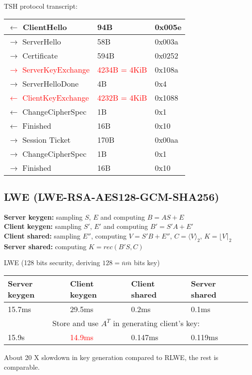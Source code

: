 \documentclass[12pt]{article}
\newcommand{\nbar}{\overline{n}}
\newcommand{\mbar}{\overline{m}}
\begin{document}
TSH protocol transcript:
\begin{center}
    \begin{tabular}{| l | l | l |}
    \hline
    $\leftarrow$ ClientHello & 94B & 0x005e\\ \hline
    $\rightarrow$ ServerHello & 58B & 0x003a\\ \hline
    $\rightarrow$ Certificate & 594B & 0x0252\\ \hline
    \textcolor{red}{$\rightarrow$ ServerKeyExchange} & \textcolor{red}{4234B = 4KiB} & 0x108a\\ \hline
    $\rightarrow$ ServerHelloDone & 4B & 0x4\\ \hline
    \textcolor{red}{$\leftarrow$ ClientKeyExchange} & \textcolor{red}{4232B = 4KiB} & 0x1088\\ \hline
    $\leftarrow$ ChangeCipherSpec & 1B & 0x1\\ \hline
    $\leftarrow$ Finished & 16B & 0x10\\ \hline
    $\rightarrow$ Session Ticket & 170B & 0x00aa\\ \hline
    $\rightarrow$ ChangeCipherSpec & 1B & 0x1\\ \hline
    $\rightarrow$ Finished & 16B & 0x10\\ \hline
    \end{tabular}
\end{center}

\subsection{LWE \tiny{(LWE-RSA-AES128-GCM-SHA256)}}

\footnotesize{\textbf{Server keygen:} sampling $S$, $E$ and computing $B = AS + E$\\
\textbf{Client keygen:} sampling $S'$, $E'$ and computing $B' = S'A + E'$\\
\textbf{Client shared:} sampling $E''$, computing $V = S'B + E''$, $C = \langle V \rangle_2$, $K = \lfloor V \rceil_2$\\
\textbf{Server shared:} computing $K = rec(B'S, C)$\\}

LWE (128 bits security, deriving $128 = \nbar \mbar$ bits key)
\begin{center}
    \begin{tabular}{| l | l | l | l |}
    \hline
    Server keygen & Client keygen & Client shared & Server shared \\ \hline
    15.7ms & 29.5ms & 0.2ms & 0.1ms \\ \hline
    \multicolumn{4}{c}{Store and use $A^T$ in generating client's key:} \\ \hline
    15.9s &   \textcolor{red}{14.9ms} &   0.147ms &   0.119ms \\ \hline
    \end{tabular}
\end{center}
About 20 X slowdown in key generation compared to RLWE, the rest is comparable.
\end{document}
